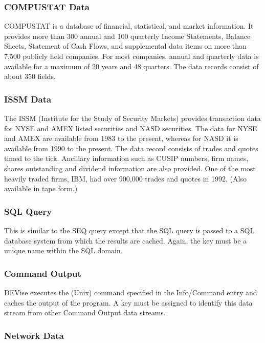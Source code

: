 \subsubsection{COMPUSTAT Data}

COMPUSTAT is a database of financial, statistical, and market information. It
provides more than 300 annual and 100 quarterly Income Statements, Balance
Sheets, Statement of Cash Flows, and supplemental data items on more than 7,500
publicly held companies. For most companies, annual and quarterly data is
available for a maximum of 20 years and 48 quarters. The data records consist of
about 350 fields.

\subsubsection{ISSM Data}

The ISSM (Institute for the Study of Security Markets) provides transaction data
for NYSE and AMEX listed securities and NASD securities. The data for NYSE and
AMEX are available from 1983 to the present, whereas for NASD it is available
from 1990 to the present. The data record consists of trades and quotes timed to
the tick. Ancillary information such as CUSIP numbers, firm names, shares
outstanding and dividend information are also provided. One of the most heavily
traded firms, IBM, had over 900,000 trades and quotes in 1992. (Also available
in tape form.)

\subsubsection{SQL Query}

This is similar to the SEQ query except that the SQL query is passed to a SQL
database system from which the results are cached. Again, the key must be a
unique name within the SQL domain.

\subsubsection{Command Output}

DEVise executes the (Unix) command specified in the Info/Command entry and
caches the output of the program. A key must be assigned to identify this data
stream from other Command Output data streams.

\subsubsection{Network Data}

